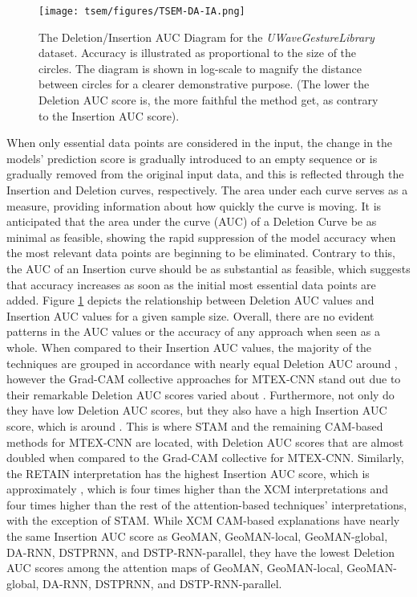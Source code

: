 \documentclass{svproc}
\begin{document}
\begin{figure}[h!]
\centering
\texttt{[image: tsem/figures/TSEM-DA-IA.png]}
\caption{The Deletion/Insertion AUC Diagram for the \textit{UWaveGestureLibrary} dataset. Accuracy is
illustrated as proportional to the size of the circles. The diagram is shown in log-scale to magnify the distance between circles for a clearer demonstrative purpose. (The lower the Deletion AUC score is, the more faithful the method get, as contrary to the Insertion AUC score).}
\label{fig:tsemdaia}
\end{figure}
When only essential data points are considered in the input, the change in the models' prediction score is gradually introduced to an empty sequence or is gradually removed from the original input data, and this is reflected through the Insertion and Deletion curves, respectively. The area under each curve serves as a measure, providing information about how quickly the curve is moving. It is anticipated that the area under the curve (AUC) of a Deletion Curve be as minimal as feasible, showing the rapid suppression of the model accuracy when the most relevant data points are beginning to be eliminated. Contrary to this, the AUC of an Insertion curve should be as substantial as feasible, which suggests that accuracy increases as soon as the initial most essential data points are added. Figure \ref{fig:tsemdaia} depicts the relationship between Deletion AUC values and Insertion AUC values for a given sample size. Overall, there are no evident patterns in the AUC values or the accuracy of any approach when seen as a whole. When compared to their Insertion AUC values, the majority of the techniques are grouped in accordance with nearly equal Deletion AUC around , however the Grad-CAM collective approaches for MTEX-CNN stand out due to their remarkable Deletion AUC scores varied about . Furthermore, not only do they have low Deletion AUC scores, but they also have a high Insertion AUC score, which is around . This is where STAM and the remaining CAM-based methods for MTEX-CNN are located, with Deletion AUC scores that are almost doubled when compared to the Grad-CAM collective for MTEX-CNN. Similarly, the RETAIN interpretation has the highest Insertion AUC score, which is approximately , which is four times higher than the XCM interpretations and four times higher than the rest of the attention-based techniques' interpretations, with the exception of STAM. While XCM CAM-based explanations have nearly the same Insertion AUC score as GeoMAN, GeoMAN-local, GeoMAN-global, DA-RNN, DSTPRNN, and DSTP-RNN-parallel, they have the lowest Deletion AUC scores among the attention maps of GeoMAN, GeoMAN-local, GeoMAN-global, DA-RNN, DSTPRNN, and DSTP-RNN-parallel. 
\end{document}
